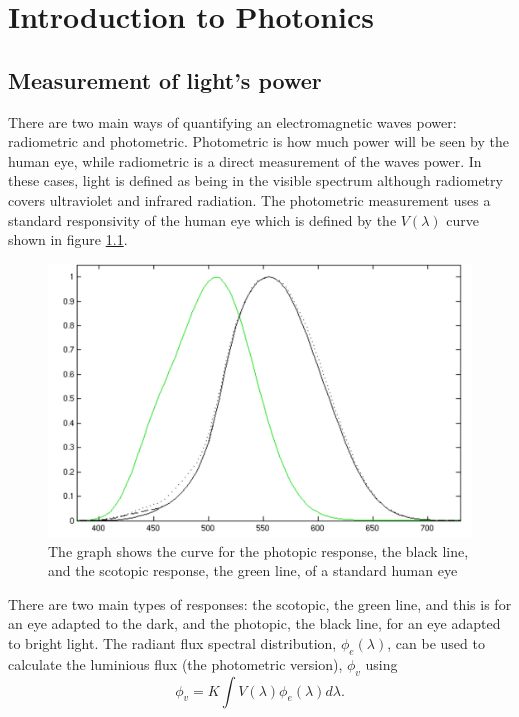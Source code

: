 \chapter{Introduction to Photonics}
\minitoc
\pagebreak
\section{Measurement of light's power}
There are two main ways of quantifying an electromagnetic waves power: radiometric and photometric.
Photometric is how much power will be seen by the human eye, while radiometric is a direct measurement of the waves power.
In these cases, light is defined as being in the visible spectrum although radiometry covers ultraviolet and infrared radiation.
The photometric measurement uses a standard responsivity of the human eye which is defined by the $V(\lambda)$ curve  shown in figure \ref{fig:eye}.
\begin{figure}[H]
	\includegraphics[width=\linewidth]{eye}
	\caption{The graph shows the curve for the photopic response, the black line, and the scotopic response, the green line, of a standard human eye}
	\label{fig:eye}
\end{figure}
There are two main types of responses: the scotopic, the green line, and this is for an eye adapted to the dark, and the photopic, the black line, for an eye adapted to bright light.
The radiant flux spectral distribution, $\phi_e(\lambda)$, can be used to calculate the luminious flux (the photometric version), $\phi_v$ using 
\begin{equation}
\phi_v = K\int{V(\lambda)\phi_e(\lambda)d\lambda}.
\label{eq:luminous}
\end{equation}


